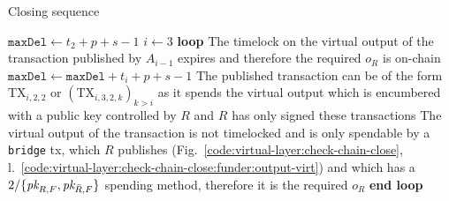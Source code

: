   \begin{center}
    \begin{notitlebox}{Closing sequence}
      \ \\
      \begin{algorithmic}[1]
        \State $\texttt{maxDel} \gets t_2 + p + s - 1$ 
        \State $i \gets 3$
        \label{code:settling-process:init-i}
        \State \textbf{loop}
        \Indent
            \State The timelock on the virtual output of the transaction
            published by $A_{i-1}$ expires and therefore the required $o_R$ is
            on-chain
          \Else \: 
            \State $\texttt{maxDel} \gets \texttt{maxDel} + t_i + p + s - 1$
            \State The published transaction can be of the form $\mathrm{TX}_{i,
            2, 2}$ or $(\mathrm{TX}_{i, 3, 2, k})_{k > i}$ as it spends the
            virtual output which is encumbered with a public key controlled by
            $R$ and $R$ has only signed these transactions
             
              \State The virtual output of the transaction is not timelocked and
              is only spendable by a \texttt{bridge} tx, which $R$ publishes
              (Fig.~\ref{code:virtual-layer:check-chain-close},
              l.~\ref{code:virtual-layer:check-chain-close:funder:output-virt})
              and which has a $2/\{\textit{pk}_{R, F}, \textit{pk}_{\bar{R}, F}\}$ spending
              method, therefore it is the required $o_R$
            \Else \: 
              \label{code:settling-process:increment}
            \EndIf
          \EndIf
        \EndIndent
        \State \textbf{end loop}
        \State {}
      \end{algorithmic}
    \end{notitlebox}
    \label{code:settling-process}
  \end{center} \ \\

